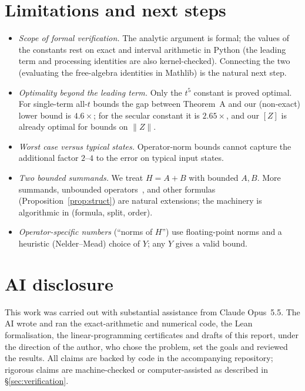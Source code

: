 \documentclass[11pt]{article}
\newcommand{\norm}[1]{\lVert #1\rVert}
\newcommand{\lb}[1]{[#1]}
\theoremstyle{plain}
\theoremstyle{definition}
\theoremstyle{remark}
\begin{document}
\section{Limitations and next steps}\label{sec:limits}

\begin{itemize}[leftmargin=*]
\item \emph{Scope of formal verification.} The analytic argument is formal; the values of the
 constants rest on exact and interval arithmetic in Python (the leading term and processing identities
 are also kernel-checked). Connecting the two (evaluating the free-algebra identities in Mathlib) is the
 natural next step.
\item \emph{Optimality beyond the leading term.} Only the $t^5$ constant is proved optimal. For
 single-term all-$t$ bounds the gap between Theorem~A and our (non-exact) lower bound is $4.6\times$; for
 the secular constant it is $2.65\times$, and our $\lb Z$ is already optimal for bounds on $\norm Z$.
\item \emph{Worst case versus typical states.} Operator-norm bounds cannot capture the additional factor
 $2$--$4$ to the error on typical input states.
\item \emph{Two bounded summands.} We treat $H=A+B$ with bounded $A,B$. More summands, unbounded
 operators~\cite{DescombesThalhammer2010}, and other formulas (Proposition~\ref{prop:struct}) are natural
 extensions; the machinery is algorithmic in (formula, split, order).
\item \emph{Operator-specific numbers} (``norms of $H$'') use floating-point norms and a heuristic
 (Nelder--Mead) choice of $Y$; any $Y$ gives a valid bound.
\end{itemize}

\section*{AI disclosure}
This work was carried out with substantial assistance from Claude Opus~5.5. The AI wrote and ran the exact-arithmetic and numerical code, the Lean formalisation, the
linear-programming certificates and drafts of this report, under the direction of the author, who
chose the problem, set the goals and reviewed the results. All claims are backed by code in the
accompanying repository; rigorous claims are machine-checked or computer-assisted as described in
\S\ref{sec:verification}.
\end{document}
